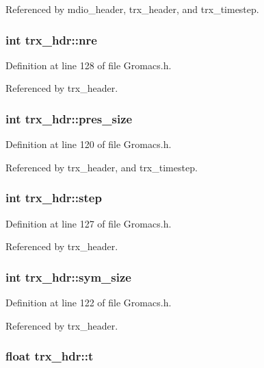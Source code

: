 Referenced by mdio\_\-header, trx\_\-header, and trx\_\-timestep.
\subsubsection{\setlength{\rightskip}{0pt plus 5cm}int trx\_\-hdr::nre}\label{structtrx__hdr_m14}




Definition at line 128 of file Gromacs.h.

Referenced by trx\_\-header.
\subsubsection{\setlength{\rightskip}{0pt plus 5cm}int trx\_\-hdr::pres\_\-size}\label{structtrx__hdr_m6}




Definition at line 120 of file Gromacs.h.

Referenced by trx\_\-header, and trx\_\-timestep.
\subsubsection{\setlength{\rightskip}{0pt plus 5cm}int trx\_\-hdr::step}\label{structtrx__hdr_m13}




Definition at line 127 of file Gromacs.h.

Referenced by trx\_\-header.
\subsubsection{\setlength{\rightskip}{0pt plus 5cm}int trx\_\-hdr::sym\_\-size}\label{structtrx__hdr_m8}




Definition at line 122 of file Gromacs.h.

Referenced by trx\_\-header.
\subsubsection{\setlength{\rightskip}{0pt plus 5cm}float trx\_\-hdr::t}\label{structtrx__hdr_m15}




